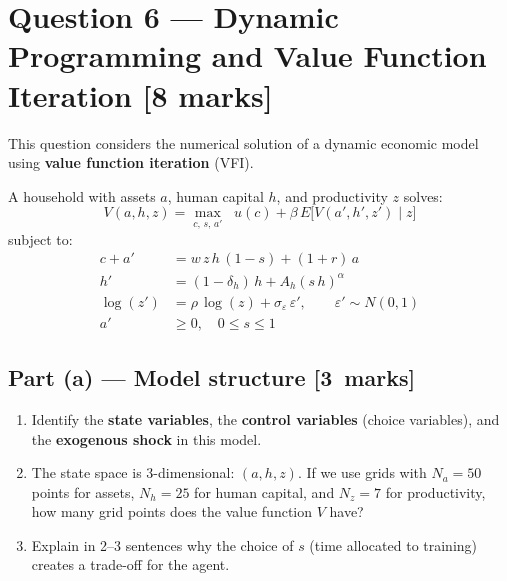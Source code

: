\documentclass[11pt,a4paper]{article}
\newcommand{\mkpts}[1]{\hfill\textbf{[#1~marks]}}
\begin{document}
\newpage

\section*{Question 6 --- Dynamic Programming and Value Function Iteration \hfill [8 marks]}

This question considers the numerical solution of a dynamic economic model using \textbf{value function iteration} (VFI).

A household with assets $a$, human capital $h$, and productivity $z$ solves:
\[
V(a,h,z) = \max_{c,\,s,\,a'} \;\; u(c) + \beta\, E\bigl[V(a',h',z') \mid z\bigr]
\]
subject to:
\begin{align*}
c + a' &= w\,z\,h\,(1-s) + (1+r)\,a  \tag{budget}\\
h' &= (1-\delta_h)\,h + A_h(s\,h)^\alpha \tag{human capital law of motion}\\
\log(z') &= \rho\,\log(z) + \sigma_\varepsilon\,\varepsilon', \qquad \varepsilon' \sim N(0,1) \tag{productivity}\\
a' &\ge 0, \quad 0 \le s \le 1 \tag{constraints}
\end{align*}

\subsection*{Part (a) --- Model structure \mkpts{3}}

\begin{enumerate}[label=(\roman*),nosep]
\item Identify the \textbf{state variables}, the \textbf{control variables} (choice variables), and the \textbf{exogenous shock} in this model.
\item The state space is 3-dimensional: $(a, h, z)$.  If we use grids with $N_a = 50$ points for assets, $N_h = 25$ for human capital, and $N_z = 7$ for productivity, how many grid points does the value function $V$ have?
\item Explain in 2--3 sentences why the choice of $s$ (time allocated to training) creates a trade-off for the agent.
\end{enumerate}
\end{document}
